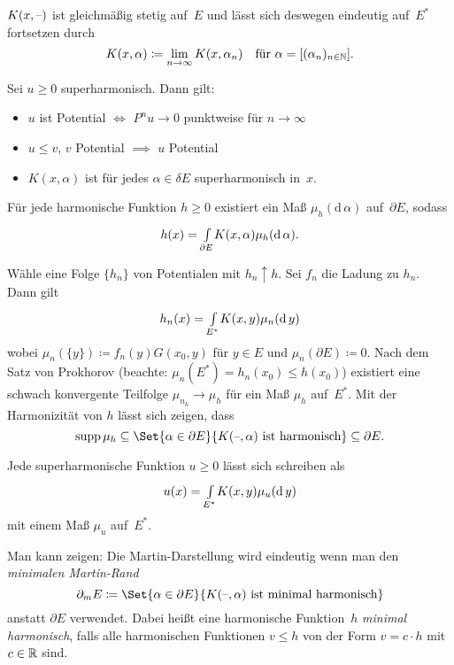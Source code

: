 \documentclass{cheat-sheet}
\begin{document}
\begin{lemdefn}
  $K(x, \text{--})$ ist gleichmäßig stetig auf~$E$ und lässt sich deswegen eindeutig auf~$E^*$ fortsetzen durch
  \[
    K(x, \alpha) \coloneqq \lim_{n \to \infty} K(x, \alpha_n) \quad
    \text{für } \alpha = [(\alpha_n)_{n \in \mathbb{N}}].
  \]
\end{lemdefn}

\begin{lem}
  Sei $u \geq 0$ superharmonisch.
  Dann gilt:
  \begin{itemize}
    \item $u$ ist Potential $\iff$ $P^n u \to 0$ punktweise für $n \to \infty$
    \item $u \leq v$, $v$ Potential $\implies$ $u$ Potential
    \item $K(x, \alpha)$ ist für jedes $\alpha \in \delta E$ superharmonisch in~$x$.
  \end{itemize}
\end{lem}

\begin{satz}
  Für jede harmonische Funktion $h \geq 0$ existiert ein Maß $\mu_h(\mathrm{d}\,\alpha)$ auf~$\partial E$, sodass
  \[
    h(x) = {\textstyle \int\limits_{\partial E}^{}} K(x, \alpha) \mu_h(\mathrm{d}\,\alpha).
  \]
\end{satz}

\begin{beweisskizze}
  Wähle eine Folge $\{ h_n \}$ von Potentialen mit $h_n \uparrow h$.
  Sei $f_n$ die Ladung zu $h_n$.
  Dann gilt
  \[
    h_n(x) = {\textstyle \int\limits_{E^*}^{}} K(x, y) \mu_n(\mathrm{d}\,y)
  \]
  wobei $\mu_n(\{ y \}) \coloneqq f_n(y) G(x_0, y)$ für $y \in E$ und $\mu_n(\partial E) \coloneqq 0$.
  Nach dem Satz von Prokhorov (beachte: $\mu_n(E^*) = h_n(x_0) \leq h(x_0)$) existiert eine schwach konvergente Teilfolge $\mu_{n_k} \to \mu_h$ für ein Maß $\mu_h$ auf~$E^*$.
  Mit der Harmonizität von $h$ lässt sich zeigen, dass
  \[
    \supp \mu_h \subseteq \Set{\alpha \in \partial E}{K(\blank, \alpha) \text{ ist harmonisch}} \subseteq \partial E.
  \]
\end{beweisskizze}

\begin{kor}
  Jede superharmonische Funktion $u \geq 0$ lässt sich schreiben als
  \[
    u(x) = {\textstyle \int\limits_{E^*}^{}} K(x, y) \mu_u(\mathrm{d}\,y)
  \]
  mit einem Maß $\mu_u$ auf~$E^*$.
\end{kor}

\begin{bem}
  Man kann zeigen: Die Martin-Darstellung wird eindeutig wenn man den \emph{minimalen Martin-Rand}
  \[
    \partial_m E \coloneqq \Set{\alpha \in \partial E}{K(\blank, \alpha) \text{ ist minimal harmonisch}}
  \]
  anstatt $\partial E$ verwendet.
  Dabei heißt eine harmonische Funktion~$h$ \textit{minimal harmonisch}, falls alle harmonischen Funktionen $v \leq h$ von der Form $v = c \cdot h$ mit $c \in \mathbb{R}$ sind.
\end{bem}
\end{document}
